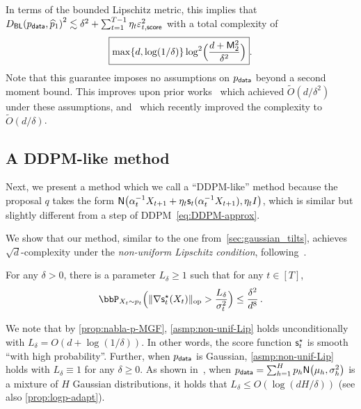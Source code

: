 In terms of the bounded Lipschitz metric, this implies that $\Dbl{\pdata}{\widehat p_1}^2 \lesssim \delta^2 + \sum_{t=1}^{T-1} \eta_t \epssct^2$ with a total complexity of %
\begin{align*}
    \boxed{\max\{d, \log(1/\delta)\} \log^2\prn[\Big]{\frac{d+\mathsf M_2^2}{\delta^2}}}.
\end{align*}
Note that this guarantee imposes no assumptions on $\pdata$ beyond a second moment bound.
This improves upon prior works~\citet{Ben+24Diffusion, ConDurSil25KLDiffusion} which achieved $\widetilde O(d/\delta^2)$ under these assumptions, and~\citet{JaiZha25SharpKL, LiYan25Diffusion} which recently improved the complexity to $\widetilde O(d/\delta)$.

 






\subsection{A DDPM-like method}


Next, we present a method which we call a ``DDPM-like'' method because the proposal $q$ takes the form $\normal{\alpha_t^{-1} \xr{t+1} + \eta_t \scf_t(\alpha_t^{-1} \xr{t+1}), \eta_t I}$, which is similar but slightly different %
from a step of DDPM~\eqref{eq:DDPM-approx}.


We show that our method, similar to the one from~\cref{sec:gaussian_tilts}, achieves $\sqrt{d}$-complexity under the \emph{non-uniform Lipschitz condition}, following~\citet{jiao2024instance, jiao2025optimal}.

\newcommand{\Ldel}{L_\delta}
\newcommand{\piz}[2][\xz]{\nu_{#1}(#2)}

\begin{assumption}\label{asmp:non-unif-Lip}
For any $\delta>0$, there is a parameter $\Ldel\geq 1$ such that for any $t\in[T]$,
\begin{align}
    \bbP_{X_t\sim p_t}\prn[\Big]{ \nrmop{\nabla \scfs_t(X_t)}> \frac{\Ldel}{\sigma_t^2} }\leq \frac{\delta^2}{d^8}\,.
\end{align}
\end{assumption}

We note that by \cref{prop:nabla-p-MGF}, \cref{asmp:non-unif-Lip} holds unconditionally with $L_\delta=O(d+\log(1/\delta))$. In other words, the score function $\scfs_t$ is smooth ``with high probability''. Further, when $\pdata$ is Gaussian, \cref{asmp:non-unif-Lip} holds with $L_\delta\equiv 1$ for any $\delta\geq 0$. 
As shown in~\citet{jiao2025optimal}, when $\pdata=\sum_{h=1}^H p_h\normal{\mu_h,\sigma_h^2}$ is a mixture of $H$ Gaussian distributions, it holds that $L_\delta\leq O(\log(dH/\delta))$ (see also \cref{prop:logp-adapt}).






